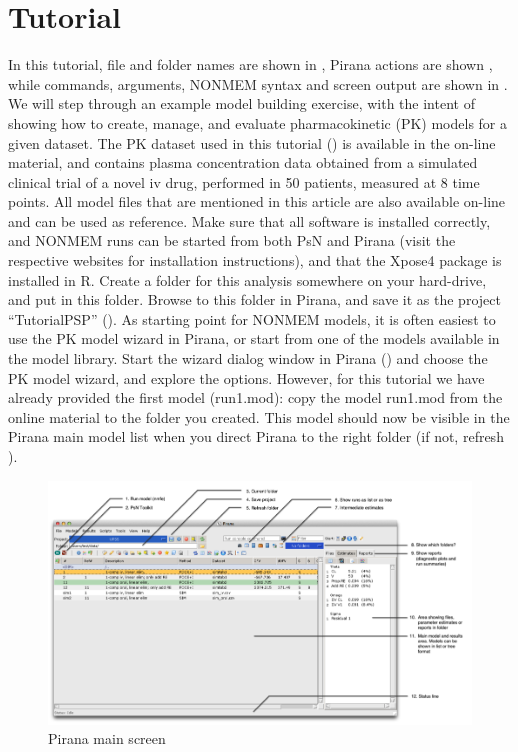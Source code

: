 \section{Tutorial}In this tutorial, file and folder names are shown
in , Pirana actions are shown , while commands,
arguments, NONMEM syntax and screen output are shown in . We will step through an example model building exercise, with
the intent of showing how to create, manage, and evaluate
pharmacokinetic (PK) models for a given dataset. The PK dataset used
in this tutorial () is available in the on-line material, and
contains plasma concentration data obtained from a simulated clinical
trial of a novel iv drug, performed in 50 patients, measured at 8 time
points. All model files that are mentioned in this article are also
available on-line and can be used as reference. Make sure that all
software is installed correctly, and NONMEM runs can be started from
both PsN and Pirana (visit the respective websites for installation
instructions), and that the Xpose4 package is installed in R. Create a
folder for this analysis somewhere on your hard-drive, and put 
in this folder. Browse to this folder in Pirana, and save it as the
project “TutorialPSP” (). As starting point for
NONMEM models, it is often easiest to use the PK model wizard in
Pirana, or start from one of the models available in the model
library. Start the wizard dialog window in Pirana ()
and choose the PK model wizard, and explore the options. However, for
this tutorial we have already provided the first model (run1.mod):
copy the model run1.mod from the online material to the folder you
created. This model should now be visible in the Pirana main model
list when you direct Pirana to the right folder (if not, refresh
). 

\begin{figure}[H] \centering
    \includegraphics[scale=0.65]{images/fig1_Pirana_main.png}
    \caption{Pirana main screen}
\end{figure}

